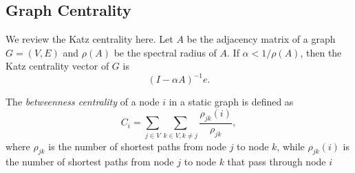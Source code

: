 \documentclass[12pt]{article}
\theoremstyle{definition}
\begin{document}
\subsection{Graph Centrality}
\label{sec:katz-centrality}

We review the Katz centrality here.
Let $A$ be the adjacency matrix of a graph $G=(V,E)$ and $\rho(A)$ be the spectral radius of $A$. If $\alpha < 1/ \rho(A)$, then the Katz centrality vector of $G$ is
\[
(I - \alpha A)^{-1}e.
\]

The \emph{betweenness centrality} of a node $i$ in a static graph is defined as
$$
C_i = \sum_{j \in V}\sum_{k \in V, k \ne j} \frac{\rho_{jk}(i)}{\rho_{jk}},
$$
where $\rho_{jk}$ is the number of shortest paths from node $j$ to node $k$, while $\rho_{jk}(i)$ is the number of shortest paths from node $j$ to node $k$ that pass through node $i$




\end{document}
